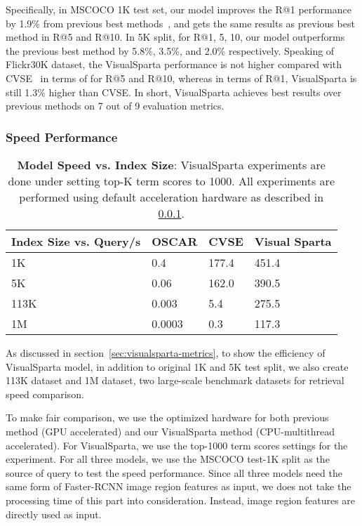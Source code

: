 \documentclass[11pt,a4paper]{article}
\begin{document}
Specifically, in MSCOCO 1K test set, our model improves the R@1 performance by 1.9\% from previous best methods~\cite{wang2020consensus}, and gets the same results as previous best method in R@5 and R@10. In 5K split, for R@1, 5, 10, our model outperforms the previous best method by 5.8\%,  3.5\%, and 2.0\% respectively. Speaking of Flickr30K dataset, the VisualSparta performance is not higher compared with CVSE~\cite{wang2020consensus} in terms of for R@5 and R@10, whereas in terms of R@1, VisualSparta is still 1.3\% higher than CVSE. In short, VisualSparta achieves best results over previous methods on 7 out of 9 evaluation metrics. 


\subsubsection{Speed Performance}
\label{sec:speed-perf}

\begin{table}[ht]
\centering
\begin{tabular}{p{}|p{}p{}p{}} \hline
Index Size vs. Query/s & OSCAR  & CVSE  & Visual Sparta \\ \hline
1K        & 0.4    & 177.4 & 451.4        \\
5K        & 0.06   & 162.0 & 390.5        \\
113K      & 0.003  & 5.4   & 275.5        \\
1M        & 0.0003 & 0.3   & 117.3        \\ \hline
\end{tabular}
\caption{\textbf{Model Speed vs. Index Size}: VisualSparta experiments are done under setting top-K term scores to 1000. All experiments are performed using default acceleration hardware as described in \ref{sec:speed-perf}.}
\label{tbl:visualsparta-speed}
\end{table}



As discussed in section~\ref{sec:visualsparta-metrics}, to show the efficiency of VisualSparta model, in addition to original 1K and 5K test split, we also create 113K dataset and 1M dataset, two large-scale benchmark datasets for retrieval speed comparison. 

To make fair comparison, we use the optimized hardware for both previous method (GPU accelerated) and our VisualSparta method (CPU-multithread accelerated). For VisualSparta, we use the top-1000 term scores settings for the experiment. For all three models, we use the MSCOCO test-1K split as the source of query to test the speed performance. Since all three models need the same form of Faster-RCNN image region features as input, we does not take the processing time of this part into consideration. Instead, image region features are directly used as input. 
\end{document}
